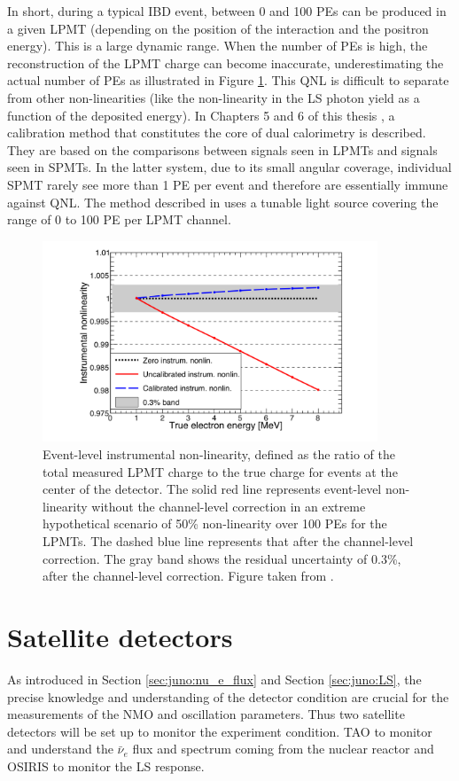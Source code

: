 \documentclass[../main.tex]{subfiles}
\begin{document}
In short, during a typical IBD event, between 0 and 100 PEs can be produced in a given LPMT (depending on the position of the interaction and the positron energy). This is a large dynamic range. When the number of PEs is high, the reconstruction of the LPMT charge can become inaccurate, underestimating the actual number of PEs as illustrated in Figure \ref{fig:juno:instr_nl}. This QNL is difficult to separate from other non-linearities (like the non-linearity in the LS photon yield as a function of the deposited energy). In Chapters 5 and 6 of this thesis \cite{han_dual_2021}, a calibration method that constitutes the core of dual calorimetry is described.  They are based on the comparisons between signals seen in LPMTs and signals seen in SPMTs. In the latter system, due to its small angular coverage, individual SPMT rarely see more than 1 PE per event and therefore are essentially immune against QNL. The method described in \cite{han_dual_2021} uses a tunable light source covering the range of 0 to 100 PE per LPMT channel.

\begin{figure}[ht]
  \centering
  \includegraphics[height=6cm]{images/juno/instr_non_linearity.png}
  \caption{Event-level instrumental non-linearity, defined as the ratio of the total measured LPMT charge to the true charge for events at the center of the detector. The solid red line represents event-level non-linearity without the channel-level correction in an extreme hypothetical scenario of 50\% non-linearity over 100 PEs for the LPMTs. The dashed blue line represents that after the channel-level correction. The gray band shows the residual uncertainty of 0.3\%, after the channel-level correction. Figure taken from \cite{juno_collaboration_calibration_2021}.}
  \label{fig:juno:instr_nl}
\end{figure}


\section{Satellite detectors}
As introduced in Section \ref{sec:juno:nu_e_flux} and Section \ref{sec:juno:LS}, the precise knowledge and understanding of the detector condition are crucial for the measurements of the NMO and oscillation parameters. Thus two satellite detectors will be set up to monitor the experiment condition. TAO to monitor and understand the $\bar{\nu}_e$ flux and spectrum coming from the nuclear reactor and OSIRIS to monitor the LS response.
\end{document}
